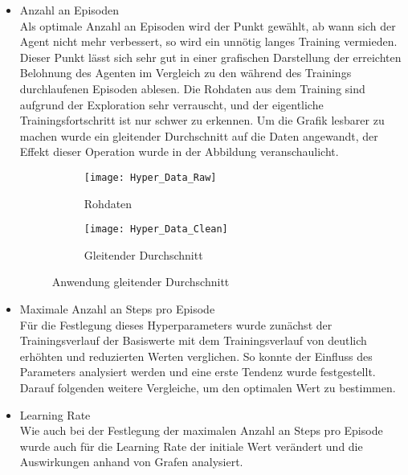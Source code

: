 \begin{itemize}
    \item Anzahl an Episoden\\
    Als optimale Anzahl an Episoden wird der Punkt gewählt, ab wann sich der Agent nicht mehr verbessert, so wird ein unnötig langes Training vermieden. 
    Dieser Punkt lässt sich sehr gut in einer grafischen Darstellung der erreichten Belohnung des Agenten im Vergleich zu den während des Trainings durchlaufenen Episoden ablesen. 
    Die Rohdaten aus dem Training sind aufgrund der Exploration sehr verrauscht, und der eigentliche Trainingsfortschritt ist nur schwer zu erkennen.
    Um die Grafik lesbarer zu machen wurde ein gleitender Durchschnitt auf die Daten angewandt, der Effekt dieser Operation wurde in der Abbildung  veranschaulicht.

    \begin{figure}[H]
        \centering
        \begin{subfigure}{.5\textwidth}
          \centering
          \texttt{[image: Hyper\_Data\_Raw]}
          \caption{Rohdaten}
          \label{fig:NumOfEpisods_Raw}
        \end{subfigure}%
        \begin{subfigure}{.5\textwidth}
          \centering
          \texttt{[image: Hyper\_Data\_Clean]}
          \caption{Gleitender Durchschnitt}
          \label{fig:NumOfEpisods_clean}
        \end{subfigure}
        \caption{Anwendung gleitender Durchschnitt}
        \label{fig:NumOfEpisods_MovingAVG}
    \end{figure}

    \item Maximale Anzahl an Steps pro Episode\\
    Für die Festlegung dieses Hyperparameters wurde zunächst der Trainingsverlauf der Basiswerte mit dem Trainingsverlauf von deutlich erhöhten und reduzierten Werten verglichen.
    So konnte der Einfluss des Parameters analysiert werden und eine erste Tendenz wurde festgestellt.
    Darauf folgenden weitere Vergleiche, um den optimalen Wert zu bestimmen.

    \item Learning Rate\\
    Wie auch bei der Festlegung der maximalen Anzahl an Steps pro Episode wurde auch für die Learning Rate der initiale Wert verändert und die Auswirkungen anhand von Grafen analysiert.


\end{itemize}
